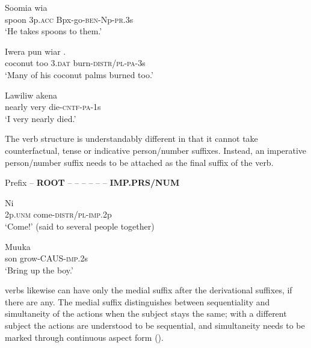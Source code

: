 \ea%
\label{ex:3:x180}
\gll Soomia wia  \\
spoon 3p.\textsc{acc} Bpx-go-\textsc{ben}-Np-\textsc{pr}.3s\\
\glt`He takes spoons to them.'
\z

\ea%
\label{ex:3:x181}
\gll Iwera pun wiar . \\
coconut too 3.\textsc{dat} burn-\textsc{distr}/\textsc{pl}-\textsc{pa}-3s\\
\glt`Many of his coconut palms burned too.'
\z

\ea%
\label{ex:3:x182}
\gll Lawiliw akena  \\
nearly very die-\textsc{cntf}-\textsc{pa}-1s \\
\glt`I very nearly died.'
\z

The  verb structure is understandably different in that it cannot take counterfactual, tense or indicative person/number suffixes. Instead, an imperative person/number suffix needs to be attached as the final suffix of the verb.

Prefix -- \textbf{ROOT} --  --  --  --  --  -- \textbf{IMP.PRS/NUM}

\ea%
\label{ex:3:x183}
\gll Ni  \\
2p.\textsc{unm} come-\textsc{distr}/\textsc{pl}-\textsc{imp}.2p\\
\glt`Come!' (said to several people together) 
\z

\ea%
\label{ex:3:x184}
\gll Muuka  \\
son grow-CAUS-\textsc{imp}.2s \\
\glt`Bring up the boy.' 
\z

 verbs likewise can have only the medial suffix after the derivational suffixes, if there are any. The medial suffix distinguishes between sequentiality  and simultaneity  of the actions when the subject stays the same; with a different subject  the actions are understood to be sequential, and simultaneity needs to be marked through continuous aspect form ().
 
